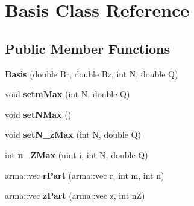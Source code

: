 \hypertarget{classBasis}{}\section{Basis Class Reference}
\label{classBasis}
\subsection*{Public Member Functions}
\begin{DoxyCompactItemize}
\item 
{\bfseries Basis} (double Br, double Bz, int N, double Q)\hypertarget{classBasis_abf7660a6971c8dc4d6576ceabd2e6c7f}{}\label{classBasis_abf7660a6971c8dc4d6576ceabd2e6c7f}

\item 
void {\bfseries setm\+Max} (int N, double Q)\hypertarget{classBasis_ad1a7276938a6aa4317f95ece2d30a4a2}{}\label{classBasis_ad1a7276938a6aa4317f95ece2d30a4a2}

\item 
void {\bfseries set\+N\+Max} ()\hypertarget{classBasis_a1383e39e6446bd74156662284ad22219}{}\label{classBasis_a1383e39e6446bd74156662284ad22219}

\item 
void {\bfseries set\+N\+\_\+z\+Max} (int N, double Q)\hypertarget{classBasis_a6fa6cc0e47498de1f344e67a92589667}{}\label{classBasis_a6fa6cc0e47498de1f344e67a92589667}

\item 
int {\bfseries n\+\_\+\+Z\+Max} (uint i, int N, double Q)\hypertarget{classBasis_ac67d7670fba8f307f4b547740d5aad92}{}\label{classBasis_ac67d7670fba8f307f4b547740d5aad92}

\item 
arma\+::vec {\bfseries r\+Part} (arma\+::vec r, int m, int n)\hypertarget{classBasis_ae5645b0cbf32ffa6164c7b4262b96904}{}\label{classBasis_ae5645b0cbf32ffa6164c7b4262b96904}

\item 
arma\+::vec {\bfseries z\+Part} (arma\+::vec z, int nZ)\hypertarget{classBasis_a80f8ef9d74a399da05e909b2db5abfe9}{}\label{classBasis_a80f8ef9d74a399da05e909b2db5abfe9}

\end{DoxyCompactItemize}
